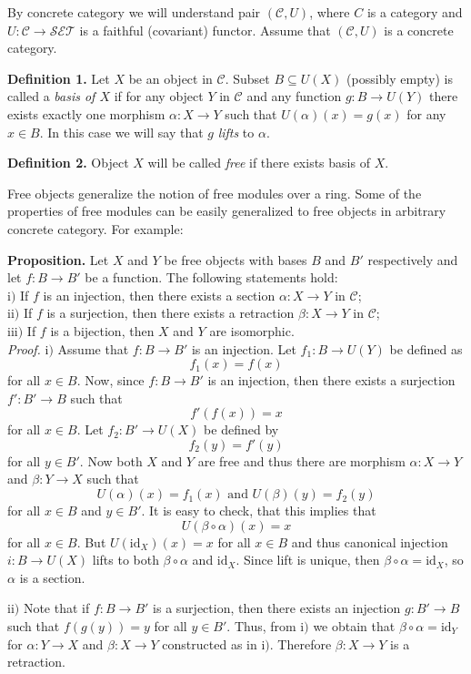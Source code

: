 \documentclass[12pt]{article}
\begin{document}
By concrete category we will understand pair $(\mathcal{C},U)$, where $C$ is a category and $U:\mathcal{C}\to\mathcal{SET}$ is a faithful (covariant) functor. Assume that $(\mathcal{C},U)$ is a concrete category.

\textbf{Definition 1.} Let $X$ be an object in $\mathcal{C}$. Subset $B\subseteq U(X)$ (possibly empty) is called a \textit{basis of $X$} if for any object $Y$ in $\mathcal{C}$ and any function $g:B\to U(Y)$ there exists exactly one morphism $\alpha:X\to Y$ such that $U(\alpha)(x)=g(x)$ for any $x\in B$. In this case we will say that $g$ \textit{lifts} to $\alpha$.

\textbf{Definition 2.} Object $X$ will be called \textit{free} if there exists basis of $X$.

Free objects generalize the notion of free modules over a ring. Some of the properties of free modules can be easily generalized to free objects in arbitrary concrete category. For example:

\textbf{Proposition.} Let $X$ and $Y$ be free objects with bases $B$ and $B'$ respectively and let $f:B\to B'$ be a function. The following statements hold:\\
$\mathrm{i)}$ If $f$ is an injection, then there exists a section $\alpha:X\to Y$ in $\mathcal{C}$;\\
$\mathrm{ii)}$ If $f$ is a surjection, then there exists a retraction $\beta:X\to Y$ in $\mathcal{C}$;\\
$\mathrm{iii)}$ If $f$ is a bijection, then $X$ and $Y$ are isomorphic.\\

\textit{Proof.} $\mathrm{i)}$ Assume that $f:B\to B'$ is an injection. Let $f_1:B\to U(Y)$ be defined as $$f_1(x)=f(x)$$
for all $x\in B$. Now, since $f:B\to B'$ is an injection, then there exists a surjection $f':B'\to B$ such that $$f'(f(x))=x$$
for all $x\in B$. Let $f_2:B'\to U(X)$ be defined by
$$f_2(y)=f'(y)$$
for all $y\in B'$. Now both $X$ and $Y$ are free and thus there are morphism $\alpha: X\to Y$ and $\beta:Y\to X$ such that
$$U(\alpha)(x)=f_1(x)\mbox{ and }U(\beta)(y)=f_2(y)$$
for all $x\in B$ and $y\in B'$. It is easy to check, that this implies that
$$U(\beta\circ\alpha)(x)=x$$
for all $x\in B$. But $U(\mathrm{id}_{X})(x)=x$ for all $x\in B$ and thus canonical injection $i:B\to U(X)$ lifts to both $\beta\circ\alpha$ and $\mathrm{id}_{X}$. Since lift is unique, then $\beta\circ\alpha=\mathrm{id}_{X}$, so $\alpha$ is a section.

$\mathrm{ii)}$ Note that if $f:B\to B'$ is a surjection, then there exists an injection $g:B'\to B$ such that $f(g(y))=y$ for all $y\in B'$. Thus, from $\mathrm{i)}$ we obtain that $\beta\circ\alpha=\mathrm{id}_{Y}$ for $\alpha:Y\to X$ and $\beta:X\to Y$ constructed as in $\mathrm{i)}$. Therefore $\beta:X\to Y$ is a retraction.
\end{document}
